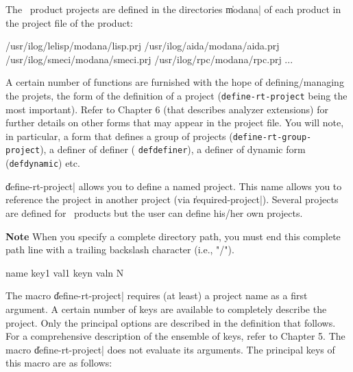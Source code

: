 The \Ilog\ product projects are defined in the directories \|modana| of each product in the project file of the product:
\begin{Code*}
/usr/ilog/lelisp/modana/lisp.prj
/usr/ilog/aida/modana/aida.prj
/usr/ilog/smeci/modana/smeci.prj
/usr/ilog/rpc/modana/rpc.prj
 ...
\end{Code*}

A certain number of functions are furnished with the hope of defining/managing the projets, the form of the definition of a project ({\tt define-rt-project} being the most important).  Refer to Chapter 6 (that describes analyzer extensions) for further details on other forms that may appear in the project file.  You will note, in particular, a form that defines a group of projects ({\tt define-rt-group-project}), a definer of definer ( {\tt defdefiner}), a definer of dynamic form ({\tt defdynamic}) etc.


\|define-rt-project| allows you to define a named project.  This name allows you to reference the project in another project (via \|required-project|). Several projects are defined for \Ilog\  products but the user can define his/her own projects.

\begin{Side}{\bf Note}
When you specify a complete directory path, you must end this complete path line with a trailing backslash character (i.e., "/").
\end{Side}

 {name key1 val1 keyn valn} {N}

The macro \|define-rt-project| requires (at least) a project name as a first argument.
A certain number of keys are available to completely describe the project.  Only the principal options are described in the definition that follows.  For a comprehensive description of the ensemble of keys, refer to Chapter 5.  The macro \|define-rt-project| does not evaluate its arguments.  The principal keys of this macro are as follows: 

